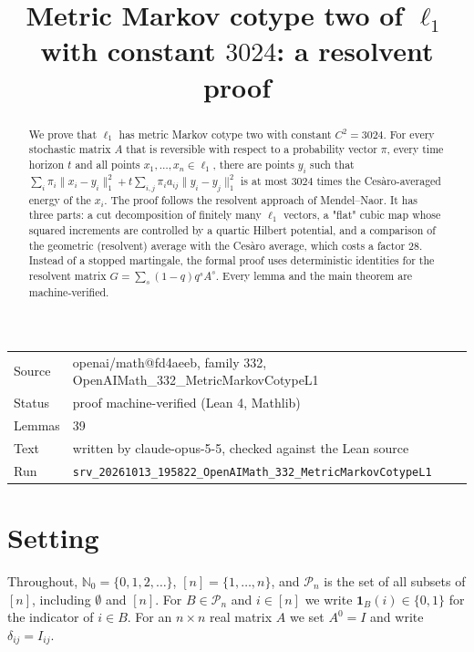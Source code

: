 \documentclass[11pt]{article}
\title{Metric Markov cotype two of $\ell_1$ with constant $3024$: a resolvent proof}
\date{}
\theoremstyle{definition}
\theoremstyle{remark}
\newcommand{\one}{\mathbf{1}}
\newcommand{\Nz}{\mathbb{N}_0}
\newcommand{\Pn}{\mathcal{P}_n}
\begin{document}
\maketitle
\begin{abstract}
We prove that $\ell_1$ has metric Markov cotype two with constant $C^2=3024$. For every stochastic matrix $A$ that is reversible with respect to a probability vector $\pi$, every time horizon $t$ and all points $x_1,\dots,x_n\in\ell_1$, there are points $y_i$ such that $\sum_i\pi_i\|x_i-y_i\|_1^2+t\sum_{i,j}\pi_ia_{ij}\|y_i-y_j\|_1^2$ is at most $3024$ times the Ces\`aro-averaged energy of the $x_i$. The proof follows the resolvent approach of Mendel--Naor. It has three parts: a cut decomposition of finitely many $\ell_1$ vectors, a "flat" cubic map whose squared increments are controlled by a quartic Hilbert potential, and a comparison of the geometric (resolvent) average with the Ces\`aro average, which costs a factor $28$. Instead of a stopped martingale, the formal proof uses deterministic identities for the resolvent matrix $G=\sum_s(1-q)q^sA^s$. Every lemma and the main theorem are machine-verified.
\end{abstract}

\begin{center}\small
\begin{tabular}{@{}ll@{}}
\toprule
Source & openai/math@fd4aeeb, family 332, OpenAIMath\_332\_MetricMarkovCotypeL1 \\
Status & proof machine-verified (Lean 4, Mathlib) \\
Lemmas & 39 \\
Text & written by claude-opus-5-5, checked against the Lean source \\
Run & \texttt{srv\_20261013\_195822\_OpenAIMath\_332\_MetricMarkovCotypeL1} \\
\bottomrule
\end{tabular}
\end{center}

\tableofcontents

\section{Setting}

Throughout, $\Nz=\{0,1,2,\dots\}$, $[n]=\{1,\dots,n\}$, and $\Pn$ is the set of all subsets of $[n]$, including $\emptyset$ and $[n]$. For $B\in\Pn$ and $i\in[n]$ we write $\one_B(i)\in\{0,1\}$ for the indicator of $i\in B$. For an $n\times n$ real matrix $A$ we set $A^0=I$ and write $\delta_{ij}=I_{ij}$.
\end{document}
